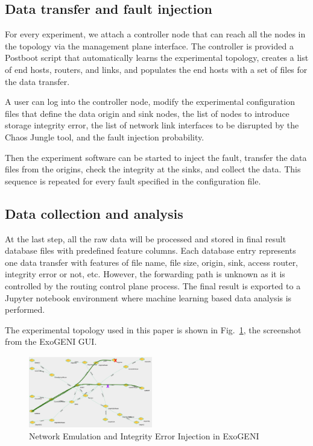 \subsection{Data transfer and fault injection}
For every experiment, we attach a controller node that can reach all the nodes in the topology via the management plane interface. The controller is provided a Postboot script that automatically learns the experimental topology, creates a list of end hosts, routers, and links, and populates the end hosts with a set of files for the data transfer.

A user can log into the controller node, modify the experimental configuration files that define the data origin and sink nodes, the list of nodes to introduce storage integrity error, the list of network link interfaces to be disrupted by the Chaos Jungle tool, and the fault injection probability.

Then the experiment software can be started to inject the fault, transfer the data files from the origins, check the integrity at the sinks, and collect the data. This sequence is repeated for every fault specified in the configuration file.

\subsection{Data collection and analysis}
At the last step, all the raw data will be processed and stored in final result database files with predefined feature columns. Each database entry represents one data transfer with features of file name, file size, origin, sink, access router, integrity error or not, etc. However, the forwarding path is unknown as it is controlled by the routing control plane process. The final result is exported to a Jupyter notebook environment where machine learning based data analysis is performed.

The experimental topology used in this paper is shown in Fig.~\ref{fig:topology}, the screenshot from the ExoGENI GUI.

\begin{figure}[!ht]
\begin{center}
\includegraphics[width=0.48\textwidth]{./figure/ChaosJungle}
\end{center}
\caption{Network Emulation and Integrity Error Injection in ExoGENI}
\label{fig:topology}
\end{figure}



